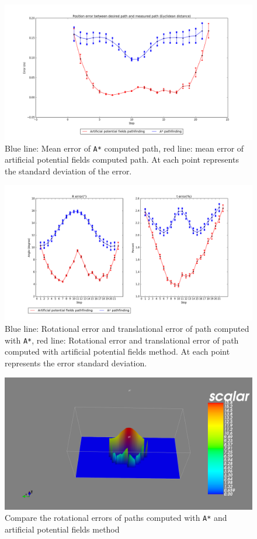 \begin{figure}[H]
\centering
\includegraphics[scale=0.3]{./fig/distanceError.png}
\caption{Blue line: Mean error of \texttt{A*} computed path, red line: mean error of artificial potential fields computed path. At each point represents the standard deviation of the error.}
\label{fig:distanceError}
\end{figure}

\begin{figure}[H]
\centering
\includegraphics[scale=0.3]{./fig/compareRErrortError.png}
\caption{Blue line: Rotational error and translational error of path computed with \texttt{A*}, red line: Rotational error and translational error of path computed with artificial potential fields method. At each point represents the error standard deviation.}
\label{fig:compareRErrortError}
\end{figure}

\begin{figure}[H]
\centering
\includegraphics[scale=0.3]{./fig/RErrorMayavi.png}
\caption{Compare the rotational errors of paths computed with \texttt{A*} and artificial potential fields method}
\label{fig:RErrorMayavi}
\end{figure}

